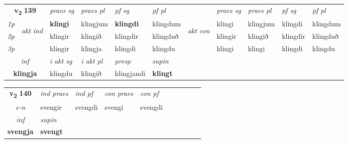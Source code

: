 \noindent
\begin{tabular}{lllllllllll} \toprule
\multicolumn{2}{c}{\textbf{v{\textsubscript{2}}} \Large{\textbf{139}}}  &  \textit{praes sg}  & \textit{praes pl}  &\textit{ pf sg} & \textit{pf pl} &  &  \textit{praes sg}  & \textit{praes pl}  & \textit{pf sg} & \textit{pf pl } \\*
	\cmidrule{3-6} \cmidrule{8-11}
 {\textit{1p}} & \multirow{3}{*}{\begin{turn}{90}\textit{akt ind}\end{turn}} & \textbf{klingi} & klingjum & \textbf{klingdi} & klingdum & \multirow{3}{*}{\begin{turn}{90}\textit{akt con}\end{turn}} &klingi & klingjum & klingdi & klingdum\\*
 {\textit{2p}} &  &  klingir  & klingið & klingdir & klingduð & & klingir & klingið & klingdir & klingduð \\*
{\textit{3p}} &  & klingir & klingja & klingdi & klingdu & & klingi & klingi& klingdi & klingdu \\*
\cmidrule{3-6} \cmidrule{8-11}

   \multicolumn{2}{c}{\textit{inf}}  & \textit{i akt sg} & \textit{i akt pl}   & \textit{presp} & \textit{supin}   \\*
  \multicolumn{2}{c}{\textbf{klingja}} & klingdu  & klingið   & klingjandi &  \textbf{klingt}   \\*
\end{tabular}

\noindent
\begin{tabular}{lllllllllll} \toprule
\multicolumn{2}{c}{\textbf{v{\textsubscript{2}}} \Large{\textbf{140}}}  &  \textit{ind praes} & \textit{ind pf} & \textit{con praes} & \textit{con pf} \\*
\multicolumn{2}{c}{ \textit{e-n} } & svengir & svengdi & svengi & svengdi \\*

\cmidrule{3-3}
   \multicolumn{2}{c}{\textit{inf}}      & \textit{supin}   \\*
  \multicolumn{2}{c}{\textbf{svengja}}       &  \textbf{svengt}   \\*
\end{tabular}

